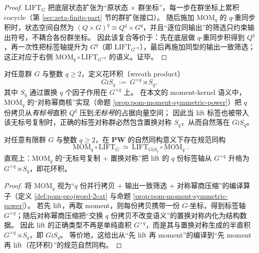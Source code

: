 \begin{proof}
\(\mathrm{LIFT}_G\) 把底层状态扩张为“原状态 \(\times\) 群坐标”，每一步在群坐标上累积 cocycle（第 \ref{sec:zeta-finite-part} 节的群扩张接口）。
随后施加 \(\mathrm{MOM}_q\) 的 \(q\)-重同步积时，状态空间自然为 \((Q\times G)^q\cong Q^q\times G^q\)，并且“逐位同输出”的筛选只约束输出符号，不耦合各份群坐标。
因此该复合等价于：先在底层做 \(q\)-重同步积得到 \(Q^q\)，再一次性把标签轴提升为 \(G^q\)（即 \(\mathrm{LIFT}_{G^{\times q}}\)），最后再施加同型的输出一致筛选；这正对应于右侧 \(\mathrm{MOM}_q\circ \mathrm{LIFT}_{G^{\times q}}\) 的语义。证毕。
\end{proof}

\begin{definition}[花环积与无标号复制]\label{def:pom-wreath-product}
对任意群 \(G\) 与整数 \(q\ge 2\)，定义花环积（wreath product）
\[
G\wr S_q\ :=\ G^{\times q}\rtimes S_q,
\]
其中 \(S_q\) 通过置换 \(q\) 个因子作用在 \(G^{\times q}\) 上。
在本文的 moment-kernel 语义中，\(\mathrm{MOM}_q\) 的“对称幂商核”实现（命题 \ref{prop:pom-moment-symmetric-power}）把 \(q\) 份拷贝从\emph{有标号}直积 \(Q^q\) 压到\emph{无标号}的占据向量空间；
因此当 lift 标签也被带入该无标号复制时，正确的标签对称群必然包含置换对称 \(S_q\)，从而自然落在 \(G\wr S_q\)。
\end{definition}

\begin{proposition}\label{prop:pom-mom-lift-wreath-exchange}\label{prop:pom-mom-lift-wreath}
对任意有限群 \(G\) 与整数 \(q\ge 2\)，在 \(\mathbf{PW}\) 的自然同构意义下存在规范同构
\[
\boxed{\;
\mathrm{MOM}_q\circ \mathrm{LIFT}_G
\ \simeq\
\mathrm{LIFT}_{G\wr S_q}\circ \mathrm{MOM}_q\; }.
\]
直观上：\(\mathrm{MOM}_q\) 的“无标号复制 + 置换对称”把 lift 的 \(q\) 份标签轴从 \(G^{\times q}\) 升格为 \(G^{\times q}\rtimes S_q\)，即花环积。
\end{proposition}

\begin{proof}
将 \(\mathrm{MOM}_q\) 视为“\(q\) 份并行拷贝 + 输出一致筛选 + 对称幂商压缩”的编译算子（定义 \ref{def:pom-projword-2cat} 与命题 \ref{prop:pom-moment-symmetric-power}）。
若先 lift，再取 moment，则每份拷贝携带一份 \(G\)-坐标，得到标签轴 \(G^{\times q}\)；随后对称幂商压缩把“交换 \(q\) 份拷贝不改变语义”的置换对称内化为结构数据。
因此 lift 的正确类型不再是单纯直积 \(G^{\times q}\)，而是其与置换对称生成的半直积 \(G^{\times q}\rtimes S_q\)，即 \(G\wr S_q\)。
等价地，这给出从“先 lift 再 moment”的编译到“先 moment 再 lift（花环积）”的规范自然同构。
\end{proof}

